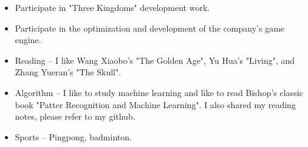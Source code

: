 ﻿\documentclass{resume_en}
\begin{document}
\begin{itemize}
	\item Participate in "Three Kingdoms" development work.
	\item Participate in the optimization and development of the company's game engine.
\end{itemize}


\Intrests

\begin{itemize}
	\item Reading -- I like Wang Xiaobo's "The Golden Age", Yu Hua's "Living", and Zhang Yueran's "The Skull".
	\item Algorithm -- I like to study machine learning and like to read Bishop's classic book "Patter Recognition and Machine Learning". I also shared my reading notes, please refer to my github.
    \item Sports -- Pingpong, badminton.
\end{itemize}
\end{document}
